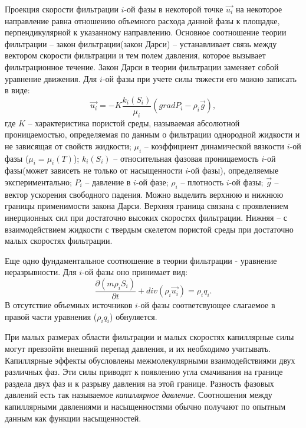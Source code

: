 Проекция скорости фильтрации $i$-ой фазы в некоторой точке
$\overrightarrow{u_i}$ на некоторое направление равна отношению объемного
расхода данной фазы к площадке, перпендикулярной к указанному направлению.
Основное соотношение теории фильтрации -- закон фильтрации(закон Дарси) -- устанавливает 
связь между вектором скорости фильтрации и тем полем давления, которое вызывает 
фильтрационное течение. Закон Дарси в теории фильтрации заменяет собой уравнение 
движения. Для $i$-ой фазы при учете силы тяжести его можно записать в виде:
\begin{equation}
\label{Darcy}
  \overrightarrow{u_i}=-K \frac{k_i(S_i)}{{\mu}_i}(grad P_i - {\rho}_i\overrightarrow{g}),
\end{equation}
где $K$ -- характеристика пористой среды, называемая
абсолютной проницаемостью, определяемая по данным о фильтрации однородной
жидкости и не зависящая от свойств жидкости; $\mu_i$ -- коэффициент динамической
вязкости $i$-ой фазы ($\mu_i=\mu_i(T)$); $k_i(S_i)$ -- относительная фазовая проницаемость $i$-ой фазы(может зависеть 
не только от насыщенности $i$-ой фазы), определяемые
экспериментально; $P_i$ -- давление в $i$-ой фазе; ${\rho}_i$ -- плотность $i$-ой фазы;
$\overrightarrow{g}$ -- вектор ускорения свободного падения.
Можно выделить верхнюю и нижнюю границы применимости закона Дарси\cite{Aziz-Settari}. Верхняя граница связана 
с проявлением инерционных сил при достаточно высоких скоростях фильтрации. Нижняя --
с взаимодействием жидкости с твердым скелетом пористой среды при достаточно малых 
скоростях фильтрации.

Еще одно фундаментальное соотношение в теории фильтрации - уравнение неразрывности. 
Для $i$-ой фазы оно принимает вид:
 \begin{equation}
 \label{mass}
 	 \frac{\partial (m \rho_i S_i)}{\partial t}+ div(\rho_i \overrightarrow{u_i}) = \rho_i q_i.
 \end{equation}
В отсутствие объемных источников $i$-ой фазы
соответсвующее слагаемое в правой части уравнения (${\rho_i}q_i$) обнуляется.

При малых размерах области фильтрации и малых скоростях капиллярные силы могут
превзойти внешний перепад давления, и их необходимо учитывать.
Капиллярные эффекты обусловлены межмолекулярными взаимодействиями двух различных
фаз. Эти силы приводят к появлению угла смачивания на границе раздела двух фаз и
к разрыву давления на этой границе. Разность фазовых давлений есть так
называемое \textit{капиллярное давление}. Соотношения между капиллярными
давлениями и насыщенностями обычно получают по опытным данным как функции насыщенностей.

